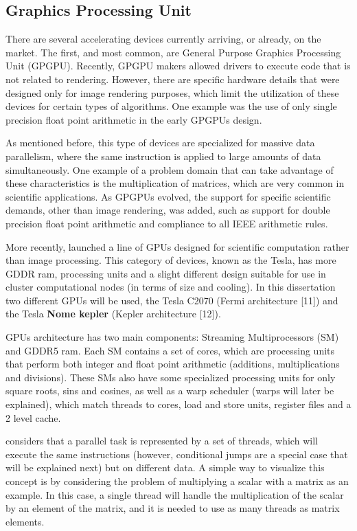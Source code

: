 \subsection{Graphics Processing Unit}

There are several accelerating devices currently arriving, or already, on the market. The first, and most common, are General Purpose Graphics Processing Unit (GPGPU). Recently, GPGPU makers allowed drivers to execute code that is not related to rendering. However, there are specific hardware details that were designed only for image rendering purposes, which limit the utilization of these devices for certain types of algorithms. One example was the use of only single precision float point arithmetic in the early GPGPUs design.

As mentioned before, this type of devices are specialized for massive data parallelism, where the same instruction is applied to large amounts of data simultaneously. One example of a problem domain that can take advantage of these characteristics is the multiplication of matrices, which are very common in scientific applications. As GPGPUs evolved, the support for specific scientific demands, other than image rendering, was added, such as support for double precision float point arithmetic and compliance to all IEEE arithmetic rules.

More recently, \nvidia [10] launched a line of GPUs designed for scientific computation rather than image processing. This category of devices, known as the Tesla, has more GDDR ram, processing units and a slight different design suitable for use in cluster computational nodes (in terms of size and cooling). In this dissertation two different \nvidia GPUs will be used, the \nvidia Tesla C2070 (Fermi architecture [11]) and the \nvidia Tesla \textbf{Nome kepler} (Kepler architecture [12]).

\nvidia GPUs architecture has two main components: Streaming Multiprocessors (SM) and GDDR5 ram. Each SM contains a set of \cuda cores, which are processing units that perform both integer and float point arithmetic (additions, multiplications and divisions). These SMs also have some specialized processing units for only square roots, sins and cosines, as well as a warp scheduler (warps will later be explained), which match \cuda threads to \cuda cores, load and store units, register files and a 2 level cache.

\nvidia considers that a parallel task is represented by a set of \cuda threads, which will execute the same instructions (however, conditional jumps are a special case that will be explained next) but on different data. A simple way to visualize this concept is by considering the problem of multiplying a scalar with a matrix as an example. In this case, a single thread will handle the multiplication of the scalar by an element of the matrix, and it is needed to use as many \cuda threads as matrix elements.

